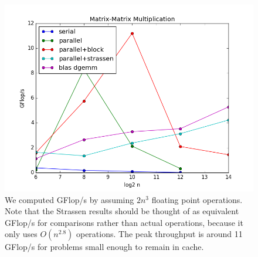 \documentclass[11pt]{article}
\begin{document}
\begin{figure}[h!]
\includegraphics[width=5in]{problem4gflop.png}
\caption{We computed GFlop/s by assuming $2n^3$ floating point operations. Note that the Strassen results should be thought of as equivalent GFlop/s for comparisons rather than actual operations, because it only uses $O(n^{2.8})$ operations. The peak throughput is around 11 GFlop/s for problems small enough to remain in cache.}
\end{figure}
\end{document}
